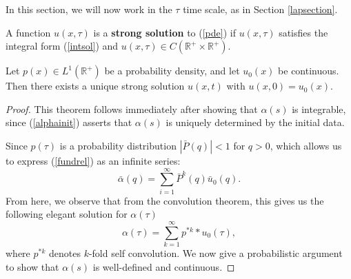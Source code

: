 In this section, we will now work in the  $\tau$ time scale, as in Section \ref{lapsection}.  

\begin{deef} A function $u(x,\tau)$ is a \textbf{strong solution} to (\ref{pde}) if $u(x,\tau)$ satisfies the integral form (\ref{intsol}) and  $u(x,\tau) \in C(\mathbb{R}^+ \times \mathbb{R}^+)$.
\end{deef}  



\begin{theorem}\label{strong} Let $p(x)\in L^1(\mathbb{R}^+)$  be a probability density, and let $u_0(x)$ be continuous.  Then there exists a unique strong solution $u(x,t)$ with $u(x,0) = u_0(x).$
\end{theorem}

\begin{proof}This theorem follows immediately after showing that $\alpha(s)$   is integrable, since (\ref{alphainit}) asserts that $\alpha(s)$ is uniquely determined by the initial data.  
 

 

 
 Since $p(\tau)$ is a probability distribution $|\bar P(q)|<1$ for $q>0$, which allows us to express (\ref{fundrel}) as an infinite series:
\begin{equation}
\bar \alpha(q) = \sum_{i = 1}^\infty \bar P^k(q)\bar u_0(q).
\end{equation}
From here, we observe that from the convolution theorem, this gives us the following elegant solution for $\alpha(\tau)$
\begin{equation}\label{convo}
\alpha(\tau) = \sum_{k = 1}^\infty p^{*k}*u_0(\tau),
\end{equation}
where $p^{*k}$ denotes $k$-fold self convolution.  We now give a probabilistic argument to  show that $\alpha(s)$ is well-defined and continuous.


\end{proof}

